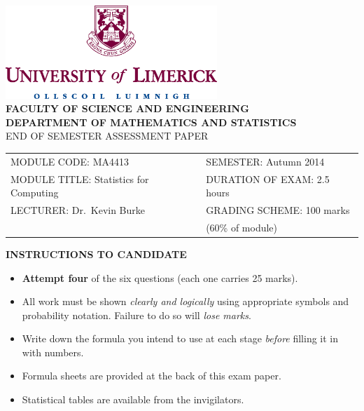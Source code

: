 \documentclass[12pt]{article}
\begin{document}
\begin{center}
\includegraphics[width=0.6\textwidth]{ul_logo}
\quad\\[1cm]
{\bf\large FACULTY OF SCIENCE AND ENGINEERING\\[0.5cm]}
{\bf\small DEPARTMENT OF MATHEMATICS AND STATISTICS\\[0.8cm]}
{\large END OF SEMESTER ASSESSMENT PAPER\\[2cm]}
\begin{adjustwidth}{-1cm}{0cm}
\begin{tabular}{l@{\qquad}l}
MODULE CODE: MA4413&SEMESTER: Autumn 2014\\[1cm]
MODULE TITLE: Statistics for Computing& DURATION OF EXAM: 2.5 hours\\[1cm]
LECTURER: Dr.~Kevin Burke& GRADING SCHEME: 100 marks \\
& \hspace{3cm} (60\% of module)\\[2cm]
\end{tabular}
\end{adjustwidth}
{\bf INSTRUCTIONS TO CANDIDATE}
\end{center}
\begin{small}
\begin{itemize}\itemsep0.3cm
\item {\bf Attempt four} of the six questions (each one carries 25 marks).
\item All work must be shown \emph{clearly and logically} using appropriate symbols and probability notation. Failure to do so will \emph{lose marks}.
\item Write down the formula you intend to use at each stage \emph{before} filling it in with numbers.
\item Formula sheets are provided at the back of this exam paper.
\item Statistical tables are available from the invigilators.
\end{itemize}
\end{small}
\newpage
\end{document}
